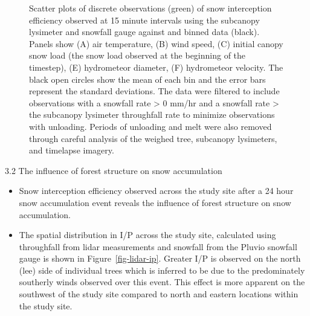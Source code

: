 \documentclass[
  letterpaper,
  DIV=11,
  numbers=noendperiod]{scrartcl}
\begin{document}
\begin{figure}


\caption{\label{fig-met-ip}Scatter plots of discrete observations
(green) of snow interception efficiency observed at 15 minute intervals
using the subcanopy lysimeter and snowfall gauge against and binned data
(black). Panels show (A) air temperature, (B) wind speed, (C) initial
canopy snow load (the snow load observed at the beginning of the
timestep), (E) hydrometeor diameter, (F) hydrometeor velocity. The black
open circles show the mean of each bin and the error bars represent the
standard deviations. The data were filtered to include observations with
a snowfall rate \textgreater{} 0 mm/hr and a snowfall rate
\textgreater{} the subcanopy lysimeter throughfall rate to minimize
observations with unloading. Periods of unloading and melt were also
removed through careful analysis of the weighed tree, subcanopy
lysimeters, and timelapse imagery.}

\end{figure}%

3.2 The influence of forest structure on snow accumulation

\begin{itemize}
\item
  Snow interception efficiency observed across the study site after a 24
  hour snow accumulation event reveals the influence of forest structure
  on snow accumulation.
\item
  The spatial distribution in I/P across the study site, calculated
  using throughfall from lidar measurements and snowfall from the Pluvio
  snowfall gauge is shown in Figure~\ref{fig-lidar-ip}. Greater I/P is
  observed on the north (lee) side of individual trees which is inferred
  to be due to the predominately southerly winds observed over this
  event. This effect is more apparent on the southwest of the study site
  compared to north and eastern locations within the study site.
\end{itemize}
\end{document}
